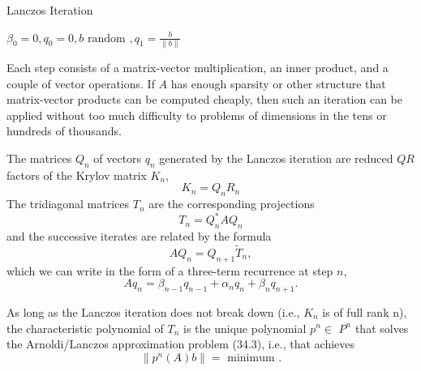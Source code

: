 \begin{algorithm}[H]
    \caption{Lanczos Iteration}
    \label{Algo 36.1}
    $ \beta _0 =0, q_0 = 0, b \text{ random }, q_1 = \frac{b}{\|b\|} $\; 
\end{algorithm}
Each step consists of a matrix-vector multiplication, an inner product, and a couple of vector operations. If $ A $ has enough sparsity or other structure that matrix-vector products can be computed cheaply, then such an iteration can be applied without too much difficulty to problems of dimensions in the tens or hundreds of thousands. 


\begin{theorem}
\label{thm: Properties of Lanczos iteration}
The matrices $Q_n$ of vectors $q_n$ generated by the Lanczos iteration are reduced $Q R$ factors of the Krylov matrix $ K_n $,
\begin{equation}
\label{eq: Lanczos QR}
K_n=Q_n R_n
\end{equation}
The tridiagonal matrices $T_n$ are the corresponding projections
\begin{equation}
\label{eq: Lanczos projection}
    T_n=Q_n^* A Q_n
\end{equation}
and the successive iterates are related by the formula
\begin{equation}
\label{eq: Lanczos iterate}
    A Q_n=Q_{n+1} \tilde{T}_n,
\end{equation}
which we can write in the form of a three-term recurrence at step $n$,
\begin{equation}
\label{eq: Lanczos three item}
    A q_n=\beta_{n-1} q_{n-1}+\alpha_n q_n+\beta_n q_{n+1} .
\end{equation}

As long as the Lanczos iteration does not break down (i.e., $K_n$ is of full rank n), the characteristic polynomial of $T_n$ is the unique polynomial $p^n \in$ $P^n$ that solves the Arnoldi/Lanczos approximation problem (34.3), i.e., that achieves
\begin{equation}
\label{eq: Lanczos approximation problem}
    \left\|p^n(A) b\right\|=\text { minimum }.
\end{equation}
\end{theorem}

